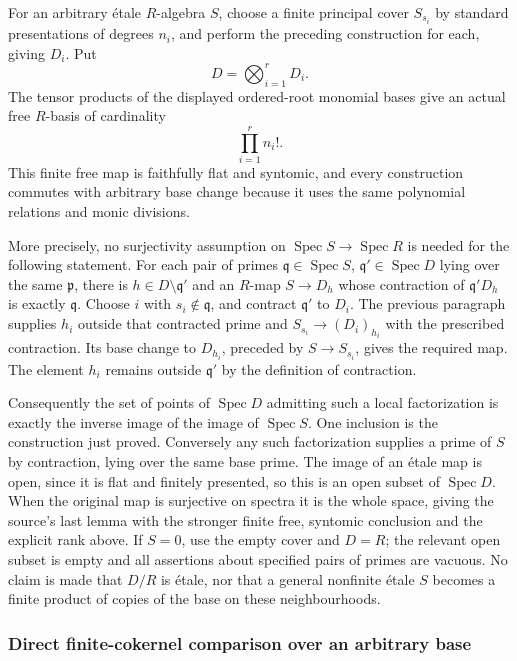 For an arbitrary étale \(R\)-algebra \(S\), choose a finite principal cover \(S_{s_i}\) by standard presentations of degrees \(n_i\), and perform the preceding construction for each, giving \(D_i\). Put \[
D=\bigotimes_{i=1}^r D_i.
\] The tensor products of the displayed ordered-root monomial bases give an actual free \(R\)-basis of cardinality \[
\prod_{i=1}^r n_i!.
\] This finite free map is faithfully flat and syntomic, and every construction commutes with arbitrary base change because it uses the same polynomial relations and monic divisions.

More precisely, no surjectivity assumption on \(\operatorname{Spec}S\to\operatorname{Spec}R\) is needed for the following statement. For each pair of primes \(\mathfrak q\in\operatorname{Spec}S\), \(\mathfrak q'\in\operatorname{Spec}D\) lying over the same \(\mathfrak p\), there is \(h\in D\setminus\mathfrak q'\) and an \(R\)-map \(S\to D_h\) whose contraction of \(\mathfrak q'D_h\) is exactly \(\mathfrak q\). Choose \(i\) with \(s_i\notin\mathfrak q\), and contract \(\mathfrak q'\) to \(D_i\). The previous paragraph supplies \(h_i\) outside that contracted prime and \(S_{s_i}\to(D_i)_{h_i}\) with the prescribed contraction. Its base change to \(D_{h_i}\), preceded by \(S\to S_{s_i}\), gives the required map. The element \(h_i\) remains outside \(\mathfrak q'\) by the definition of contraction.

Consequently the set of points of \(\operatorname{Spec}D\) admitting such a local factorization is exactly the inverse image of the image of \(\operatorname{Spec}S\). One inclusion is the construction just proved. Conversely any such factorization supplies a prime of \(S\) by contraction, lying over the same base prime. The image of an étale map is open, since it is flat and finitely presented, so this is an open subset of \(\operatorname{Spec}D\). When the original map is surjective on spectra it is the whole space, giving the source's last lemma with the stronger finite free, syntomic conclusion and the explicit rank above. If \(S=0\), use the empty cover and \(D=R\); the relevant open subset is empty and all assertions about specified pairs of primes are vacuous. No claim is made that \(D/R\) is étale, nor that a general nonfinite étale \(S\) becomes a finite product of copies of the base on these neighbourhoods.

\subsubsection{Direct finite-cokernel comparison over an arbitrary base}\label{algebra-proof-052-direct-finite-cokernel-comparison-over-an-arbitrary-base}


